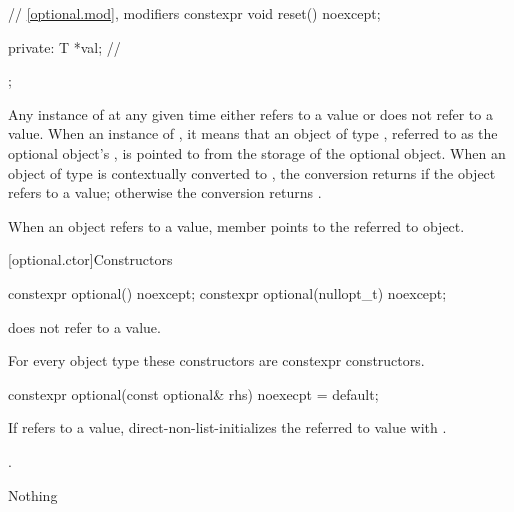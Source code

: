 \documentclass[a4paper,10pt,oneside,openany,final,article]{memoir}
\begin{document}
\begin{wording}
\begin{addedblock}
\begin{codeblock}
{{        // \ref{optional.mod}, modifiers
        constexpr void reset() noexcept;

      private:
        T *val;         // \expos
      };
    }
  \end{codeblock}

  \pnum
  Any instance of  at any given time either refers to a value or does not refer to a value.
  When an instance of  ,
  it means that an object of type , referred to as the optional object's ,
  is pointed to from the storage of the optional object.
  When an object of type  is contextually converted to ,
  the conversion returns  if the object refers to a value;
  otherwise the conversion returns .

  \pnum
  When an  object refers to a value,
  member  points to the referred to object.
  \end{addedblock}

  [optional.ctor]{Constructors}

  \begin{itemdecl}
    constexpr optional() noexcept;
    constexpr optional(nullopt_t) noexcept;
  \end{itemdecl}

  \begin{itemdescr}
    \pnum
    \ensures
     does not refer to a value.

    \pnum
    \remarks
    For every object type  these constructors are constexpr constructors.
  \end{itemdescr}

  \begin{itemdecl}
    constexpr optional(const optional& rhs) noexecpt = default;
  \end{itemdecl}

  \begin{itemdescr}
    \pnum
    \effects
    If  refers to a value, direct-non-list-initializes the referred to value
    with .

    \pnum
    \ensures
    .

    \pnum
    \throws
    Nothing


\end{itemdescr}
\end{wording}
\end{document}
